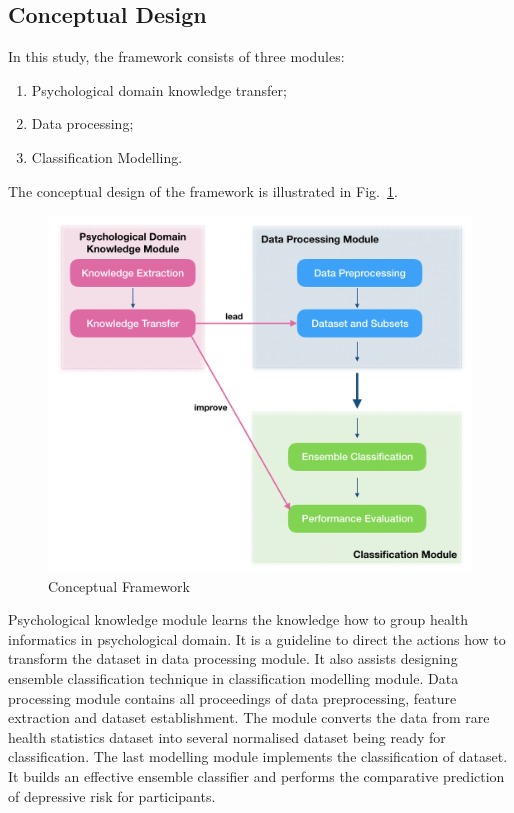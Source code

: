 \documentclass[12pt]{article}
\begin{document}
\subsection{Conceptual Design}
In this study, the framework consists of three modules:
\begin{enumerate}
  \item Psychological domain knowledge transfer;
  \item Data processing;
  \item Classification Modelling.
\end{enumerate}
The conceptual design of the framework is illustrated in Fig.~\ref{fig1}.
\begin{figure}[h]
\includegraphics[width=1\textwidth]{concepts.png}
\caption{Conceptual Framework} \label{fig1}
\end{figure}
%
Psychological knowledge module learns the knowledge how to group health informatics in psychological domain. It is a guideline to direct the actions how to transform the dataset in data processing module. It also assists designing ensemble classification technique in classification modelling module. Data processing module contains all proceedings of data preprocessing, feature extraction and dataset establishment. The module converts the data from rare health statistics dataset into several normalised dataset being ready for classification. The last modelling module implements the classification of dataset. It builds an effective ensemble classifier and performs the comparative prediction of depressive risk for participants. 
\\
\medskip
\end{document}
